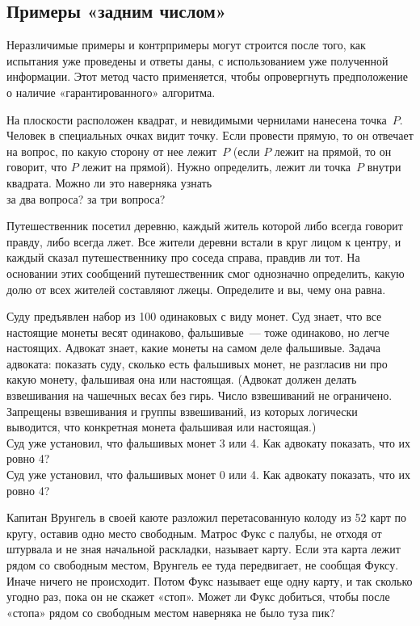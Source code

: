 \subsection*{Примеры «задним числом»}
Неразличимые примеры и контрпримеры могут строится после того, как испытания
уже проведены и ответы даны, с использованием уже полученной информации.
Этот метод часто применяется, чтобы опровергнуть предположение о наличие
«гарантированного» алгоритма.

\begin{problems}

\item
На плоскости расположен квадрат, и невидимыми чернилами нанесена точка~$P$.
Человек в специальных очках видит точку.
Если провести прямую, то он отвечает на вопрос, по какую сторону от нее
лежит~$P$ (если $P$ лежит на прямой, то он говорит, что $P$ лежит на прямой).
Нужно определить, лежит ли точка~$P$ внутри квадрата.
Можно ли это наверняка узнать
\\
\subproblem за два вопроса?
\qquad
\subproblem за три вопроса?

\item
Путешественник посетил деревню, каждый житель которой либо всегда говорит
правду, либо всегда лжет.
Все жители деревни встали в круг лицом к центру, и каждый сказал
путешественнику про соседа справа, правдив ли тот.
На основании этих сообщений путешественник смог однозначно определить, какую
долю от всех жителей составляют лжецы.
Определите и вы, чему она равна.

\item
Суду предъявлен набор из 100 одинаковых с виду монет.
Суд знает, что все настоящие монеты весят одинаково, фальшивые~— тоже
одинаково, но легче настоящих.
Адвокат знает, какие монеты на самом деле фальшивые.
Задача адвоката: показать суду, сколько есть фальшивых монет, не разгласив
ни про какую монету, фальшивая она или настоящая.
(Адвокат должен делать взвешивания на чашечных весах без гирь.
Число взвешиваний не ограничено.
Запрещены взвешивания и группы взвешиваний, из которых логически выводится, что
конкретная монета фальшивая или настоящая.)
\\
\subproblem
Суд уже установил, что фальшивых монет 3 или 4.
Как адвокату показать, что их ровно 4?
\\
\subproblem
Суд уже установил, что фальшивых монет 0 или 4.
Как адвокату показать, что их ровно 4?

\item
Капитан Врунгель в своей каюте разложил перетасованную колоду из 52 карт
по кругу, оставив одно место свободным.
Матрос Фукс с палубы, не отходя от штурвала и не зная начальной раскладки,
называет карту.
Если эта карта лежит рядом со свободным местом, Врунгель ее туда передвигает,
не сообщая Фуксу.
Иначе ничего не происходит.
Потом Фукс называет еще одну карту, и так сколько угодно раз, пока он не скажет
«стоп».
Может ли Фукс добиться, чтобы после «стопа» рядом со свободным местом
наверняка не было туза пик?

\end{problems}

